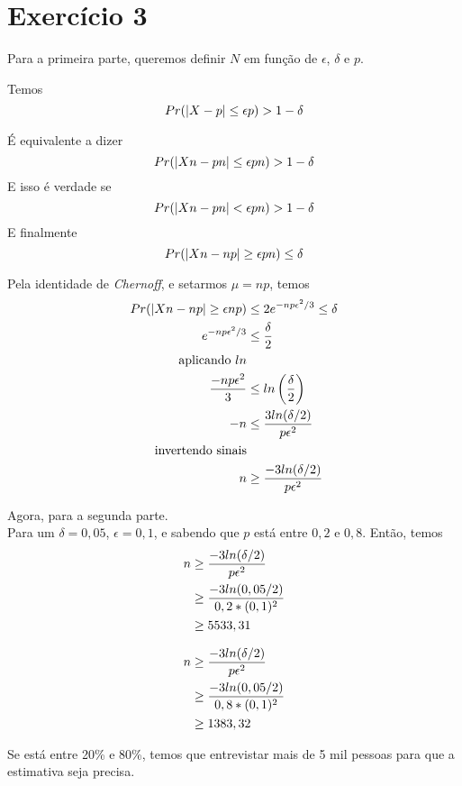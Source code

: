 \documentclass{article}
\begin{document}
\section{Exercício 3}
Para a primeira parte, queremos definir $N$ em função de $\epsilon$, $\delta$ e $p$.

Temos 
\begin{equation}
\notag
	Pr(|X - p| \leq \epsilon p) > 1 - \delta
\end{equation}

É equivalente a dizer 
\begin{equation}
	\notag
	Pr(|Xn - pn| \leq \epsilon pn) > 1 - \delta
\end{equation}
E isso é verdade se 
\begin{equation}
	\notag
	Pr(|Xn - pn| < \epsilon pn) > 1 - \delta
\end{equation}
E finalmente
\begin{equation}
	\notag 
	Pr(|Xn - np| \geq \epsilon pn) \leq \delta 
\end{equation}

Pela identidade de \emph{Chernoff}, e setarmos $\mu = np$, temos
\begin{equation}
	\notag
	\begin{split}
		Pr(|Xn - np| \geq \epsilon np) &\leq 2e^{-np\epsilon^2/3} \leq \delta\\
		e^{-np\epsilon^2/3} &\leq \dfrac{\delta}{2}\\
		\text{aplicando }ln&\\
		\dfrac{-np\epsilon^2}{3} &\leq ln\left(\dfrac{\delta}{2}\right)\\
		-n &\leq \dfrac{3ln(\delta/2)}{p\epsilon^2}\\
		\text{invertendo sinais}&\\
		n &\geq \dfrac{-3ln(\delta/2)}{p\epsilon^2}
	\end{split}
\end{equation}

Agora, para a segunda parte.\\

Para um $\delta = 0,05$, $\epsilon = 0,1$, e sabendo que $p$ está entre 
$0,2$ e $0,8$. Então, temos
\begin{equation}
	\notag
	\begin{split}
		n &\geq \dfrac{-3ln(\delta/2)}{p\epsilon^2}\\
		&\geq \dfrac{-3ln(0,05/2)}{0,2*(0,1)^2}\\
		&\geq 5533,31
	\end{split}
\end{equation}

\begin{equation}
	\notag
	\begin{split}
		n &\geq \dfrac{-3ln(\delta/2)}{p\epsilon^2}\\
		&\geq \dfrac{-3ln(0,05/2)}{0,8*(0,1)^2}\\
		&\geq 1383,32
	\end{split}
\end{equation}

Se está entre 20\% e 80\%, temos que entrevistar mais de 5 mil pessoas
para que a estimativa seja precisa.
\end{document}
